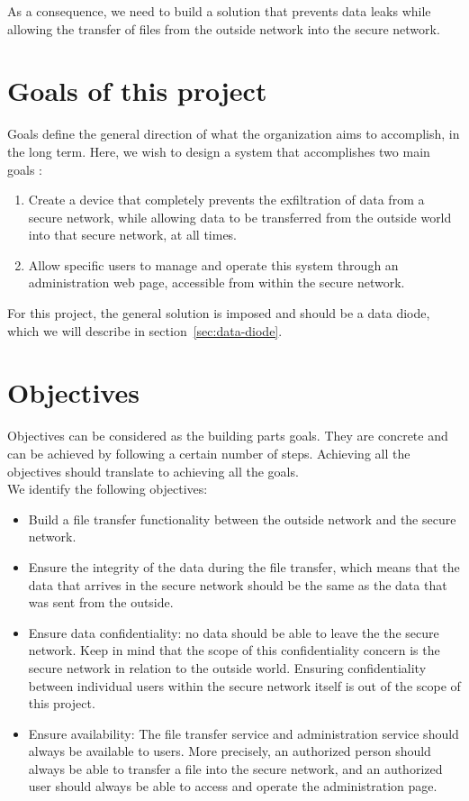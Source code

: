 \documentclass[a4paper,11pt]{article}
\begin{document}
As a consequence, we need to build a solution that prevents data leaks while allowing the transfer of files from the outside network into the secure network.

\section{Goals of this project}
Goals define the general direction of what the organization aims to accomplish, in the long term. Here, we wish to design a system that accomplishes two main goals :

\begin{enumerate}
\item{Create a device that completely prevents the exfiltration of data from a secure network, while allowing data to be transferred from the outside world into that secure network, at all times.}
\item{Allow specific users to manage and operate this system through an administration web page, accessible from within the secure network.}
\end{enumerate}

For this project, the general solution is imposed and should be a data diode, which we will describe in section~\ref{sec:data-diode}.


\section{Objectives}
Objectives can be considered as the building parts goals. They are concrete and can be achieved by following a certain number of steps. Achieving all the objectives should translate to achieving all the goals.\\

We identify the following objectives:
\begin{itemize}
\item{Build a file transfer functionality between the outside network and the secure network.}
\item{Ensure the integrity of the data during the file transfer, which means that the data that arrives in the secure network should be the same as the data that was sent from the outside.}
\item{Ensure data confidentiality: no data should be able to leave the the secure network. Keep in mind that the scope of this confidentiality concern is the secure network in relation to the outside world. Ensuring confidentiality between individual users within the secure network itself is out of the scope of this project.}
\item{Ensure availability: The file transfer service and administration service should always be available to users. More precisely, an authorized person should always be able to transfer a file into the secure network, and an authorized user should always be able to access and operate the administration page.}
\end{itemize}
\end{document}

